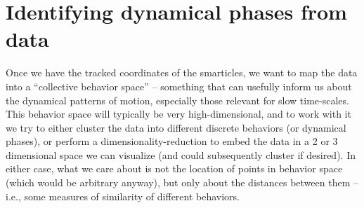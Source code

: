 \documentclass[11pt]{article}
\renewcommand{\=}[1]{\stackrel{#1}{=}} %
\renewcommand{\(}{\left (}
\renewcommand{\)}{\right  )}
\renewcommand{\[}{\left [}
\renewcommand{\]}{\right ]}
\newcommand{\<}{\left <}
\renewcommand{\>}{\right >}
\theoremstyle{definition}
\theoremstyle{remark}
\renewcommand{\todo}[1]{\textit{\color{red}[#1]}}
\begin{document}




\appendix
\renewcommand{\thesection}{\Alph{section}} 
\section{Identifying dynamical phases from data} \label{app:dataAnal}

Once we have the tracked coordinates of the smarticles, we want to map the data into a ``collective behavior space'' -- something that can usefully inform us about the dynamical patterns of motion, especially those relevant for slow time-scales. This behavior space will typically be very high-dimensional, and to work with it we try to either cluster the data into different discrete behaviors (or dynamical phases), or perform a dimensionality-reduction to embed the data in a 2 or 3 dimensional space we can visualize (and could subsequently cluster if desired). In either case, what we care about is not the location of points in behavior space (which would be arbitrary anyway), but only about the distances between them -- i.e., some measures of similarity of different behaviors. 
\end{document}

